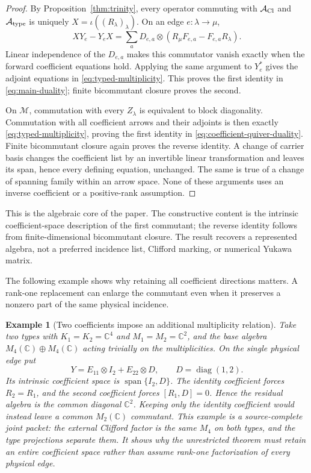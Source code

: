 \documentclass[11pt]{article}
\numberwithin{equation}{section}
\newtheorem{example}[theorem]{Example}
\theoremstyle{definition}
\theoremstyle{remark}
\newcommand{\C}{\mathbb C}
\newcommand{\Span}{\operatorname{span}}
\newcommand{\diag}{\operatorname{diag}}
\newcommand{\A}{\mathcal A}
\begin{document}
\begin{proof}
By Proposition~\ref{thm:trinity}, every operator commuting with
$\A_{\rm Cl}$ and $\A_{\rm type}$ is uniquely
$X=\iota((R_\lambda)_\lambda)$.  On an edge $e:\lambda\to\mu$,
\[
 XY_e-Y_eX
 =\sum_aD_{e,a}\otimes
          (R_\mu F_{e,a}-F_{e,a}R_\lambda).
\]
Linear independence of the $D_{e,a}$ makes this commutator vanish exactly
when the forward coefficient equations hold.  Applying the same argument
to $Y_e^*$ gives the adjoint equations in
\eqref{eq:typed-multiplicity}.  This proves the first identity in
\eqref{eq:main-duality}; finite bicommutant closure proves the second.

On $\mathscr M$, commutation with every $Z_\lambda$ is equivalent to block
diagonality.  Commutation with all coefficient arrows and their adjoints is
then exactly \eqref{eq:typed-multiplicity}, proving the first identity in
\eqref{eq:coefficient-quiver-duality}.  Finite bicommutant closure again
proves the reverse identity.  A change of carrier basis changes the
coefficient list by an invertible linear transformation and leaves its
span, hence every defining equation, unchanged.  The same is true of a
change of spanning family within an arrow space.  None of these arguments
uses an inverse coefficient or a positive-rank assumption.
\end{proof}

This is the algebraic core of the paper.  The constructive content is the
intrinsic coefficient-space description of the first commutant; the reverse
identity follows from finite-dimensional bicommutant closure.  The result
recovers a represented algebra, not a preferred incidence list, Clifford
marking, or numerical Yukawa matrix.

The following example shows why retaining all coefficient directions matters.
A rank-one replacement can enlarge the commutant even when it preserves a
nonzero part of the same physical incidence.

\begin{example}[Two coefficients impose an additional multiplicity relation]
\label{ex:two-coefficient-incidence}
Take two types with $K_1=K_2=\C^4$ and $M_1=M_2=\C^2$, and the base
algebra $M_4(\C)\oplus M_4(\C)$ acting trivially on the multiplicities.
On the single physical edge put
\[
 Y=E_{11}\otimes I_2+E_{22}\otimes D,
 \qquad D=\diag(1,2).
\]
Its intrinsic coefficient space is $\Span\{I_2,D\}$.  The identity
coefficient forces $R_2=R_1$, and the second coefficient forces
$[R_1,D]=0$.  Hence the residual algebra is the common diagonal $\C^2$.
Keeping only the identity coefficient would instead leave a common
$M_2(\C)$ commutant.  This example is a source-complete joint packet:
the external Clifford factor is the same $M_4$ on both types, and the
type projections separate them.  It shows why the unrestricted theorem
must retain an entire coefficient space rather than assume rank-one
factorization of every physical edge.
\end{example}
\end{document}
